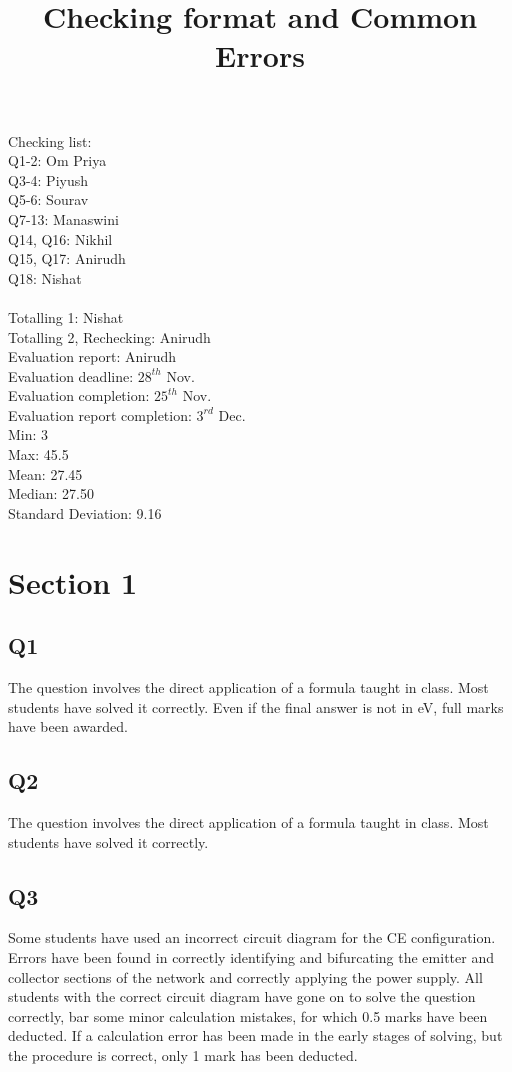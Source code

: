 \documentclass[12pt]{article}\date{}
\begin{document}
\title{Checking format and Common Errors}
\maketitle

\noindent Checking list: \\
Q1-2: Om Priya \\
Q3-4:  Piyush \\
Q5-6: Sourav \\
Q7-13: Manaswini \\
Q14, Q16: Nikhil \\
Q15, Q17:  Anirudh \\
Q18: Nishat \\ \\

\noindent Totalling 1: Nishat \\
Totalling 2, Rechecking: Anirudh \\
Evaluation report: Anirudh \\

\noindent Evaluation deadline: $28^{th}$ Nov. \\ 
Evaluation completion: $25^{th}$ Nov. \\
Evaluation report completion: $3^{rd}$ Dec. \\

\noindent Min: 3 \\
Max: 45.5 \\
Mean:  27.45 \\
Median: 27.50 \\
Standard Deviation: 9.16 \\

\section{Section 1}
\subsection{Q1}
The question involves the direct application of a formula taught in class. Most students have solved it correctly. Even if the final answer is not in eV, full marks have been awarded.
\subsection{Q2}
The question involves the direct application of a formula taught in class. Most students have solved it correctly. 
\subsection{Q3}
Some students have used an incorrect circuit diagram for the CE configuration. Errors have been found in correctly identifying and bifurcating the emitter and collector sections of the network and correctly applying the power supply. All students with the correct circuit diagram have gone on to solve the question correctly, bar some minor calculation mistakes, for which 0.5 marks have been deducted. If a calculation error has been made in the early stages of solving, but the procedure is correct, only 1 mark has been deducted.
\end{document}
